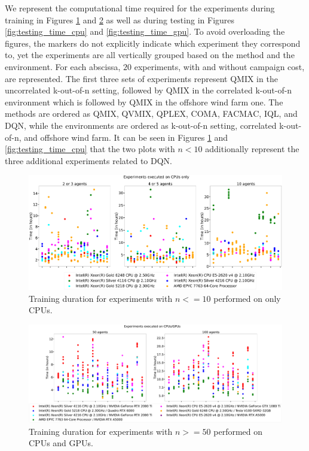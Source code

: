 We represent the computational time required for the experiments during training in Figures \ref{fig:training_time_cpu} and \ref{fig:training_time_gpu} as well as during testing in Figures \ref{fig:testing_time_cpu} and \ref{fig:testing_time_gpu}.
To avoid overloading the figures, the markers do not explicitly indicate which experiment they correspond to, yet the experiments are all vertically grouped based on the method and the environment.
For each abscissa, $20$ experiments, with and without campaign cost, are represented.
The first three sets of experiments represent QMIX in the uncorrelated k-out-of-n setting, followed by QMIX in the correlated k-out-of-n environment which is followed by QMIX in the offshore wind farm one.
The methods are ordered as QMIX, QVMIX, QPLEX, COMA, FACMAC, IQL, and DQN, while the environments are ordered as k-out-of-n setting, correlated k-out-of-n, and offshore wind farm.
It can be seen in Figures \ref{fig:training_time_cpu} and \ref{fig:testing_time_cpu} that the two plots with $n<10$ additionally represent the three additional experiments related to DQN.

\begin{figure}
    \centering
    \includegraphics[width=\textwidth]{tex_thesis/figures/ch5/training_time_cpu.pdf}
    \caption{Training duration for experiments with $n<=10$ performed on only CPUs.}
    \label{fig:training_time_cpu}
\end{figure}

\begin{figure}
    \centering
    \includegraphics[width=\textwidth]{tex_thesis/figures/ch5/training_time_gpu.pdf}
    \caption{Training duration for experiments with $n>=50$ performed on CPUs and GPUs.}
    \label{fig:training_time_gpu}
\end{figure}

